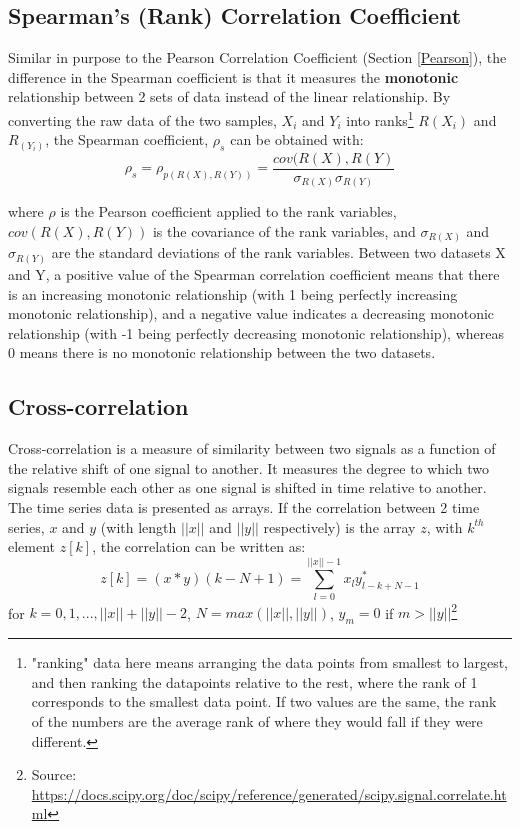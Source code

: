 \documentclass[a4paper, 10pt, conference]{ieeeconf}      %
\begin{document}
\subsection{Spearman's (Rank) Correlation Coefficient}
Similar in purpose to the Pearson Correlation Coefficient (Section \ref{Pearson}), the difference in the Spearman coefficient is that it measures the \textbf{monotonic} relationship between 2 sets of data instead of the linear relationship. By converting the raw data of the two samples, $X_i$ and $Y_i$ into ranks\footnote{"ranking" data here means arranging the data points from smallest to largest, and then ranking the datapoints relative to the rest, where the rank of 1 corresponds to the smallest data point. If two values are the same, the rank of the numbers are the average rank of where they would fall if they were different.} $R(X_i)$ and $R_(Y_i)$, the Spearman coefficient, $\rho_s$ can be obtained with:
\begin{equation}
    \rho_s = \rho_{p(R(X), R(Y))} = \frac{cov(R(X), R(Y)}{\sigma_{R(X)}\sigma_{R(Y)}}
\end{equation}

where $\rho$ is the Pearson coefficient applied to the rank variables, $cov(R(X), R(Y))$ is the covariance of the rank variables, and $\sigma_{R(X)}$ and $\sigma_{R(Y)}$ are the standard deviations of the rank variables. Between two datasets X and Y, a positive value of the Spearman correlation coefficient means that there is an increasing monotonic relationship (with 1 being perfectly increasing monotonic relationship), and a negative value indicates a decreasing monotonic relationship (with -1 being perfectly decreasing monotonic relationship), whereas 0 means there is no monotonic relationship between the two datasets. 
 
\subsection{Cross-correlation}
Cross-correlation is a measure of similarity between two signals as a function of the relative shift of one signal to another. It measures the degree to which two signals resemble each other as one signal is shifted in time relative to another. The time series data is presented as arrays. If the correlation between 2 time series, $x$ and $y$ (with length $||x||$ and $||y||$ respectively) is the array $z$, with ${k}^{th}$ element $z[{k}]$, the correlation can be written as: 
\begin{equation}
    z[{k}] = (x * y)(k - N + 1) = \sum_{l=0}^{||x||-1}x_{l}y^{*}_{l-k+N-1}
\end{equation}
for $k = 0, 1,..., ||x||+||y||-2$, $N = max(||x||, ||y||)$, $y_m = 0$ if $m > ||y||$\footnote{Source: \url{https://docs.scipy.org/doc/scipy/reference/generated/scipy.signal.correlate.html}}
\end{document}
